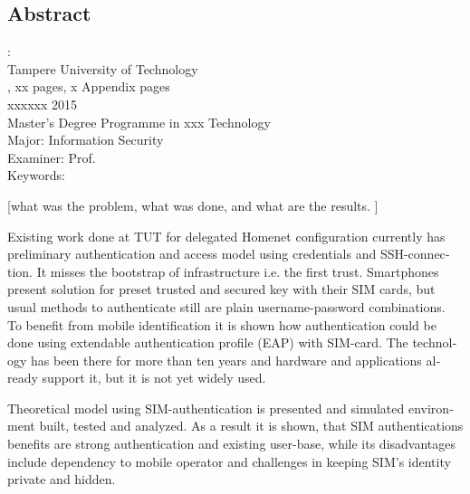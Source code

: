 \documentclass[12pt,a4paper,english]{tutthesis}
\begin{document}
\if@twoside
\clearpage
\fi


\setcounter{page}{0} %

\begin{otherlanguage}{english} %
\chapter*{Abstract}

\begin{spacing}{1.0}
  {\bf \textsf{\MakeUppercase{\@author}}}: \@title\\   %
   \textsf{Tampere University of Technology}\\
   \textsf{\@thesistype, xx pages, x Appendix pages} \\
   \textsf{xxxxxx 2015}\\
   \textsf{Master's Degree Programme in xxx Technology}\\
   \textsf{Major: Information Security}\\
   \textsf{Examiner: Prof. \@examiner}\\ %
   \textsf{Keywords: }\\
\end{spacing}

[what was the problem, what was done, and what are the results. ]

Existing work done at TUT for delegated Homenet configuration
currently has preliminary authentication and access model using
credentials and SSH-connection. It misses the bootstrap of 
infrastructure i.e. the first trust. 
Smartphones present solution for preset trusted and secured 
key with their SIM cards, but 
usual methods to authenticate still are plain username-password combinations.  
To benefit from mobile identification it is shown how authentication could be done
using extendable authentication profile (EAP) with SIM-card. The technology 
has been there for more than ten years and hardware and applications 
already support it, but it is not yet widely used.

Theoretical model using SIM-authentication is presented and simulated environment built, tested and analyzed.
As a result it is shown, that SIM authentications benefits are strong authentication and existing user-base, while its disadvantages include dependency to mobile operator and challenges in keeping SIM's identity private and hidden.


\end{otherlanguage}
\end{document}
